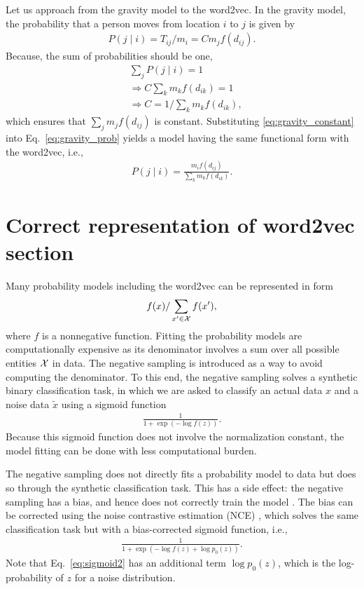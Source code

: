 \documentclass[12pt]{article} %
\def\given{\mid}
\def\ie{i.e.,~}
\begin{document}
Let us approach from the gravity model to the word2vec.
In the gravity model, the probability that a person moves from location $i$ to $j$ is given by
\begin{align}
    P\left(j \given i \right) = T_{ij} / m_i = C m_j f(d_{ij}). \label{eq:gravity_prob}
\end{align}
Because, the sum of probabilities should be one,
\begin{align}
     & \sum_{j} P(j \given i) = 1 \nonumber                                     \\
     & \Rightarrow C \sum_{k} m_k f(d_{ik}) = 1 \nonumber                       \\
     & \Rightarrow C  = 1 / \sum_{k} m_k f(d_{ik}), \label{eq:gravity_constant}
\end{align}
which ensures that $\sum_{j} m_j f(d_{ij})$ is constant.
Substituting \eqref{eq:gravity_constant}  into Eq.~\eqref{eq:gravity_prob} yields a model having the same functional form with the word2vec, \ie
\begin{align}
    P\left(j \given i \right) = \frac{m_i f(d_{ij})}{\sum_{k} m_k f(d_{ik})}. \label{eq:gravity_prob2}
\end{align}


\section{Correct representation of word2vec section}
\label{sec:correct_word2vec}

Many probability models including the word2vec can be represented in form
\begin{align}
    f(x) / \sum_{x' \in {\cal X}} f(x'),
\end{align}
where $f$ is a nonnegative function.
Fitting the probability models are computationally expensive as its denominator involves a sum over all possible entities ${\cal X}$ in data.
The negative sampling is introduced as a way to avoid computing the denominator.
To this end, the negative sampling solves a synthetic binary classification task, in which
we are asked to classify an actual data $x$ and a noise data $\tilde x$ using a sigmoid function
\begin{align}
    \label{eq:sigmoid}
    \frac{1}{1 + \exp\left( -\log f(z) \right)}.
\end{align}
Because this sigmoid function does not involve the normalization constant, the model fitting can be done with less computational burden.


The negative sampling does not directly fits a probability model to data but does so through the synthetic classification task.
This has a side effect: the negative sampling has a bias, and hence does not correctly train the model \cite{Dyer2014}.
The bias can be corrected using the noise contrastive estimation (NCE) \cite{Chia2010}, which solves the
same classification task but with a bias-corrected sigmoid function, \ie
\begin{align}
    \label{eq:sigmoid2}
    \frac{1}{1 + \exp\left( -\log f(z) + \log p_0(z) \right)}.
\end{align}
Note that Eq.~\eqref{eq:sigmoid2} has an additional term $\log p_0(z)$, which is the log-probability of $z$ for a noise distribution.
\end{document}
